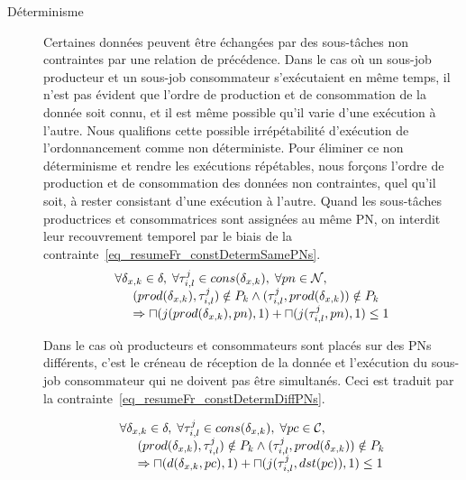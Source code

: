 \documentclass[main.tex]{subfiles}
\begin{document}
\begin{description}
    \item[Déterminisme]
        Certaines données peuvent être échangées par des sous-tâches non contraintes par une relation de précédence. Dans le cas où un sous-job producteur et un sous-job consommateur s'exécutaient en même temps, il n'est pas évident que l'ordre de production et de consommation de la donnée soit connu, et il est même possible qu'il varie d'une exécution à l'autre. Nous qualifions cette possible irrépétabilité d'exécution de l'ordonnancement comme non déterministe. Pour éliminer ce non déterminisme et rendre les exécutions répétables, nous forçons l'ordre de production et de consommation des données non contraintes, quel qu'il soit, à rester consistant d'une exécution à l'autre. Quand les sous-tâches productrices et consommatrices sont assignées au même PN, on interdit leur recouvrement temporel par le biais de la contrainte~\ref{eq_resumeFr_constDetermSamePNs}.
\begin{equation}
    \label{eq_resumeFr_constDetermSamePNs}
    \begin{array}{l}
        \forall \delta_{x,k} \in \delta , \; \forall \tau_{i,l}^j \in cons( \delta_{x,k} ), \; \forall pn \in \mathcal{N}, \\
        \hspace{5mm} ( prod(\delta_{x,k}), \tau_{i,l}^j ) \notin P_k \land (\tau_{i,l}^j, prod(\delta_{x,k})) \notin P_k \\
        \hspace{5mm} \Rightarrow \sqcap ( j(prod(\delta_{x,k}), pn) ,1) + \sqcap ( j(\tau_{i,l}^j, pn) ,1) \leq 1
    \end{array}
\end{equation}

Dans le cas où producteurs et consommateurs sont placés sur des PNs différents, c'est le créneau de réception de la donnée et l'exécution du sous-job consommateur qui ne doivent pas être simultanés. Ceci est traduit par la contrainte~\ref{eq_resumeFr_constDetermDiffPNs}.

\begin{equation}
    \label{eq_resumeFr_constDetermDiffPNs}
    \begin{array}{l}
        \forall \delta_{x,k} \in \delta ,\; \forall \tau_{i,l}^j \in cons( \delta_{x,k} ), \; \forall pc \in \mathcal{C}, \\
        \hspace{5mm} ( prod(\delta_{x,k}), \tau_{i,l}^j ) \notin P_k \land (\tau_{i,l}^j, prod(\delta_{x,k})) \notin P_k \\
        \hspace{5mm} \Rightarrow \sqcap ( d(\delta_{x,k}, pc) ,1) + \sqcap ( j(\tau_{i,l}^j, dst(pc)) ,1) \leq 1
    \end{array}
\end{equation}

        
\end{description}
\end{document}
